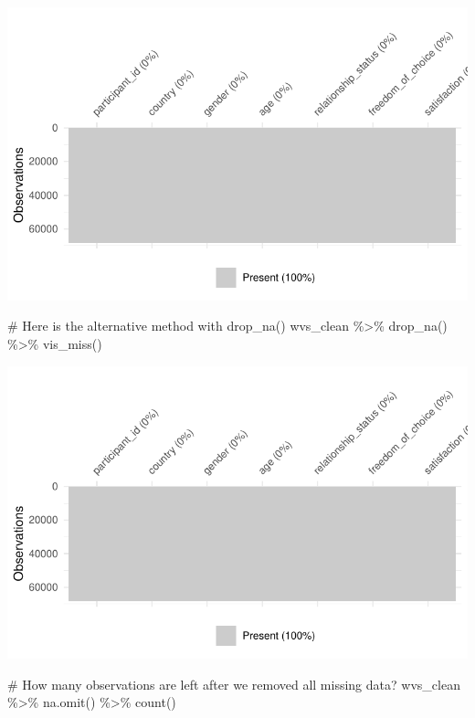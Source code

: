 \documentclass[
  letterpaper,
]{krantz}
\makeatletter
\newenvironment{Shaded}{\begin{snugshade}}{\end{snugshade}}
\newcommand{\CommentTok}[1]{\textcolor[rgb]{0.37,0.37,0.37}{#1}}
\newcommand{\FunctionTok}[1]{\textcolor[rgb]{0.28,0.35,0.67}{#1}}
\newcommand{\NormalTok}[1]{\textcolor[rgb]{0.00,0.23,0.31}{#1}}
\newcommand{\SpecialCharTok}[1]{\textcolor[rgb]{0.37,0.37,0.37}{#1}}
\newenvironment{kframe}{%
\medskip{}
\setlength{\fboxsep}{.8em}
 \def\at@end@of@kframe{}%
 \ifinner\ifhmode%
  \def\at@end@of@kframe{\end{minipage}}%
  \begin{minipage}{\columnwidth}%
 \fi\fi%
 \def\FrameCommand##1{\hskip\@totalleftmargin \hskip-\fboxsep
 \colorbox{shadecolor}{##1}\hskip-\fboxsep
     \hskip-\linewidth \hskip-\@totalleftmargin \hskip\columnwidth}%
 \MakeFramed {\advance\hsize-\width
   \@totalleftmargin\z@ \linewidth\hsize
   \@setminipage}}%
 {\par\unskip\endMakeFramed%
 \at@end@of@kframe}
\renewenvironment{Shaded}{\begin{kframe}}{\end{kframe}}
\makeatother
\begin{document}
\includegraphics{07_data_wrangling_files/figure-pdf/remove-all-missing-data-1.pdf}

\begin{Shaded}
\begin{Highlighting}[]
\CommentTok{\# Here is the alternative method with drop\_na()}
\NormalTok{wvs\_clean }\SpecialCharTok{\%\textgreater{}\%} \FunctionTok{drop\_na}\NormalTok{() }\SpecialCharTok{\%\textgreater{}\%} \FunctionTok{vis\_miss}\NormalTok{()}
\end{Highlighting}
\end{Shaded}

\includegraphics{07_data_wrangling_files/figure-pdf/alternative-of-removing-all-missing-data-points-1.pdf}

\begin{Shaded}
\begin{Highlighting}[]
\CommentTok{\# How many observations are left after we removed all missing data?}
\NormalTok{wvs\_clean }\SpecialCharTok{\%\textgreater{}\%} \FunctionTok{na.omit}\NormalTok{() }\SpecialCharTok{\%\textgreater{}\%} \FunctionTok{count}\NormalTok{()}
\end{Highlighting}
\end{Shaded}
\end{document}
